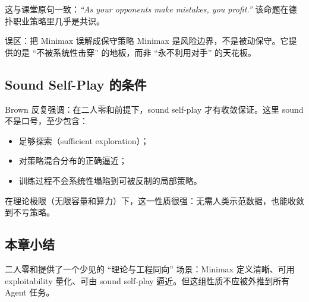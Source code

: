 这与课堂原句一致：\textit{``As your opponents make mistakes, you profit.''} 该命题在德扑职业策略里几乎是共识。

\begin{warningbox}{误区：把 Minimax 误解成保守策略}
Minimax 是风险边界，不是被动保守。它提供的是 ``不被系统性击穿'' 的地板，而非 ``永不利用对手'' 的天花板。
\end{warningbox}

\subsection{Sound Self-Play 的条件}
Brown 反复强调：在二人零和前提下，sound self-play 才有收敛保证。这里 sound 不是口号，至少包含：
\begin{itemize}
    \item 足够探索（sufficient exploration）；
    \item 对策略混合分布的正确逼近；
    \item 训练过程不会系统性塌陷到可被反制的局部策略。
\end{itemize}

在理论极限（无限容量和算力）下，这一性质很强：无需人类示范数据，也能收敛到不亏策略。

\subsection{本章小结}
二人零和提供了一个少见的 ``理论与工程同向'' 场景：Minimax 定义清晰、可用 exploitability 量化、可由 sound self-play 逼近。但这组性质不应被外推到所有 Agent 任务。

